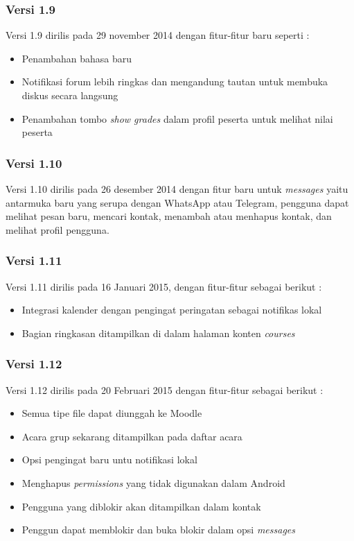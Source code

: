 \subsubsection{Versi 1.9}
Versi 1.9 dirilis pada 29 november 2014 dengan fitur-fitur baru seperti : \cite{moodle:dev}
	\begin{itemize}
		\item Penambahan bahasa baru
		\item Notifikasi forum lebih ringkas dan mengandung tautan untuk membuka diskus secara langsung
		\item Penambahan tombo \textit{show grades} dalam profil peserta untuk melihat nilai peserta
	\end{itemize}
\subsubsection{Versi 1.10}
Versi 1.10 dirilis pada 26 desember 2014 dengan fitur baru untuk \textit{messages} yaitu antarmuka baru yang serupa dengan WhatsApp atau Telegram, pengguna dapat melihat pesan baru,  mencari kontak, menambah atau menhapus kontak, dan melihat profil pengguna. \cite{moodle:dev}

\subsubsection{Versi 1.11}
Versi 1.11 dirilis pada 16 Januari 2015, dengan fitur-fitur sebagai berikut : \cite{moodle:dev}
	\begin{itemize}
		\item Integrasi kalender dengan pengingat peringatan sebagai notifikas lokal
		\item Bagian ringkasan ditampilkan di dalam halaman konten \textit{courses}
	\end{itemize}

\subsubsection{Versi 1.12}
Versi 1.12 dirilis pada 20 Februari 2015 dengan fitur-fitur sebagai berikut : \cite{moodle:dev}
	\begin{itemize}
		\item Semua tipe file dapat diunggah ke Moodle
		\item Acara grup sekarang ditampilkan pada daftar acara
		\item Opsi pengingat baru untu notifikasi lokal
		\item Menghapus \textit{permissions} yang tidak digunakan dalam Android
		\item Pengguna yang diblokir akan ditampilkan dalam kontak	
		\item Penggun dapat memblokir dan buka blokir dalam opsi \textit{messages}
	\end{itemize}

